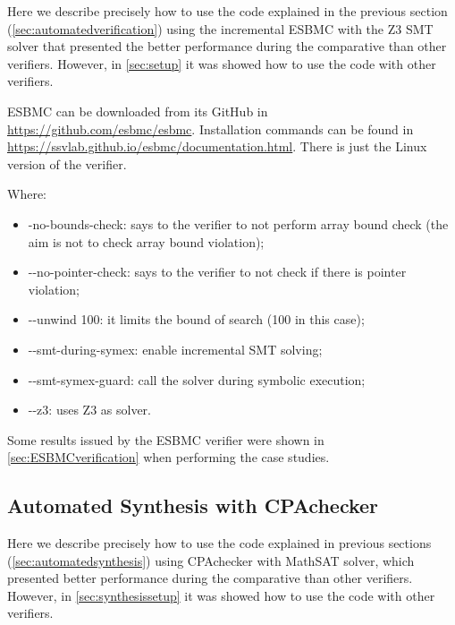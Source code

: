 Here we describe precisely how to use the code explained in the previous section (\ref{sec:automatedverification}) using the incremental ESBMC with the Z3 SMT solver that presented the better performance during the comparative than other verifiers. However, in \ref{sec:setup} it was showed how to use the code with other verifiers.

ESBMC can be downloaded from its GitHub in \url{https://github.com/esbmc/esbmc}. Installation commands can be found in \url{https://ssvlab.github.io/esbmc/documentation.html}. There is just the Linux version of the verifier.

\bigskip
{}
\bigskip

Where:
\begin{itemize}
\item -no-bounds-check: says to the verifier to not perform array bound check (the aim is not to check array bound violation);
\item -\phantom{}-no-pointer-check: says to the verifier to not check if there is pointer violation;
\item -\phantom{}-unwind 100: it limits the bound of search (100 in this case);
\item -\phantom{}-smt-during-symex: enable incremental SMT solving;
\item -\phantom{}-smt-symex-guard: call the solver during symbolic execution;
\item -\phantom{}-z3: uses Z3 as solver.
\end{itemize}

Some results issued by the ESBMC verifier were shown in \ref{sec:ESBMCverification} when performing the case studies.

\subsection{Automated Synthesis with CPAchecker}

Here we describe precisely how to use the code explained in previous sections (\ref{sec:automatedsynthesis}) using CPAchecker with MathSAT solver, which presented better performance during the comparative than other verifiers. However, in \ref{sec:synthesissetup} it was showed how to use the code with other verifiers.

